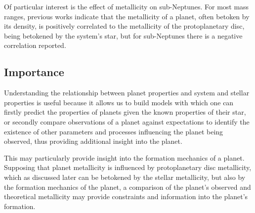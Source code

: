 \documentclass[a4paper,twocolumn,12pt]{article}
\begin{document}
Of particular interest is the effect of metallicity on sub-Neptunes. For most mass ranges, previous works indicate that the metallicity of a planet, often betoken by its density, is positively correlated to the metallicity of the protoplanetary disc, being betokened by the system's star, but for sub-Neptunes there is a negative correlation reported.

\subsection{Importance}
\label{subsection: Importance}
Understanding the relationship between planet properties and system and stellar properties is useful because it allows us to build models with which one can firstly predict the properties of planets given the known properties of their star, or secondly compare observations of a planet against expectations to identify the existence of other parameters and processes influencing the planet being observed, thus providing additional insight into the planet. %


This may particularly provide insight into the formation mechanics of a planet. Supposing that planet metallicity is influenced by protoplanetary disc metallicity, which as discussed later can be betokened by the stellar metallicity, but also by the formation mechanics of the planet, a comparison of the planet's observed and theoretical metallicity may provide constraints and information into the planet's formation.


\end{document}
